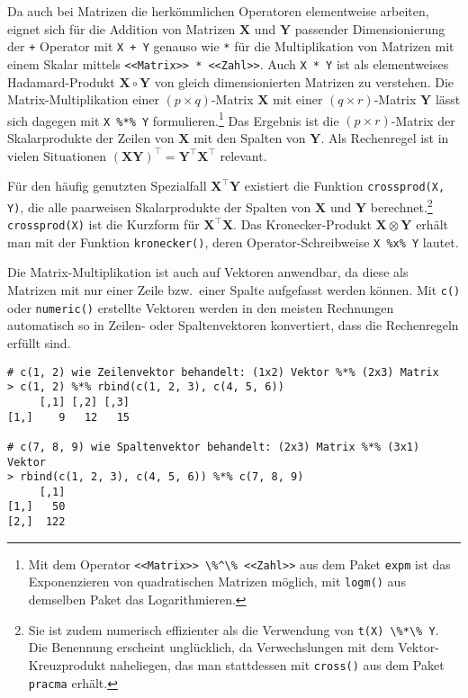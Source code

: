 Da auch bei Matrizen die herkömmlichen Operatoren elementweise arbeiten, eignet sich für die Addition von Matrizen $\bm{X}$ und $\bm{Y}$ passender Dimensionierung der \lstinline!+! Operator mit \lstinline!X + Y! genauso wie \lstinline!*! für die Multiplikation von Matrizen mit einem Skalar mittels \lstinline!<<Matrix>> * <<Zahl>>!. Auch \lstinline!X * Y! ist als elementweises Hadamard-Produkt $\bm{X} \circ \bm{Y}$ von gleich dimensionierten Matrizen zu verstehen. Die Matrix-Multiplikation einer $(p \times q)$-Matrix $\bm{X}$ mit einer $(q \times r)$-Matrix $\bm{Y}$ lässt sich dagegen mit \lstinline!X %*% Y! formulieren.\footnote{Mit dem Operator \lstinline!<<Matrix>> \%^\% <<Zahl>>! aus dem Paket \lstinline!expm! \cite{Goulet2010} ist das Exponenzieren von quadratischen Matrizen möglich, mit \lstinline!logm()! aus demselben Paket das Logarithmieren.} Das Ergebnis ist die $(p \times r)$-Matrix der Skalarprodukte der Zeilen von $\bm{X}$ mit den Spalten von $\bm{Y}$. Als Rechenregel ist in vielen Situationen $(\bm{X} \bm{Y})^{\top} = \bm{Y}^{\top} \bm{X}^{\top}$ relevant.

Für den häufig genutzten Spezialfall $\bm{X}^{\top} \bm{Y}$ existiert die Funktion \lstinline!crossprod(X, Y)!, die alle paarweisen Skalarprodukte der Spalten von $\bm{X}$ und $\bm{Y}$ berechnet.\footnote{Sie ist zudem numerisch effizienter als die Verwendung von \lstinline!t(X) \%*\% Y!. Die Benennung erscheint unglücklich, da Verwechslungen mit dem Vektor-Kreuzprodukt naheliegen, das man stattdessen mit \lstinline!cross()! aus dem Paket \lstinline!pracma! \cite{Borchers2011} erhält.} \lstinline!crossprod(X)! ist die Kurzform für $\bm{X}^{\top} \bm{X}$. Das Kronecker-Produkt $\bm{X} \otimes \bm{Y}$ erhält man mit der Funktion \lstinline!kronecker()!, deren Operator-Schreibweise \lstinline!X %x% Y! lautet.

Die Matrix-Multiplikation ist auch auf Vektoren anwendbar, da diese als Matrizen mit nur einer Zeile bzw.\ einer Spalte aufgefasst werden können. Mit \lstinline!c()! oder \lstinline!numeric()! erstellte Vektoren werden in den meisten Rechnungen automatisch so in Zeilen- oder Spaltenvektoren konvertiert, dass die Rechenregeln erfüllt sind.
\begin{lstlisting}
# c(1, 2) wie Zeilenvektor behandelt: (1x2) Vektor %*% (2x3) Matrix
> c(1, 2) %*% rbind(c(1, 2, 3), c(4, 5, 6))
     [,1] [,2] [,3]
[1,]    9   12   15

# c(7, 8, 9) wie Spaltenvektor behandelt: (2x3) Matrix %*% (3x1) Vektor
> rbind(c(1, 2, 3), c(4, 5, 6)) %*% c(7, 8, 9)
     [,1]
[1,]   50
[2,]  122
\end{lstlisting}

